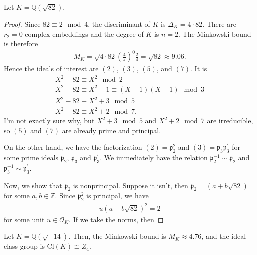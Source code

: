 \begin{exmbox}
    \begin{example}
        Let \(K = \mathbb{Q}(\sqrt{82})\).
    \end{example}    
\end{exmbox}
\begin{proof}
    Since \(82 \equiv 2 \mod{4}\), the discriminant of \(K\) is \(\Delta_K = 4 \cdot 82\). There are \(r_2 = 0\) complex embeddings and the degree of \(K\) is \(n = 2\). The Minkowski bound is therefore
    \begin{align*}
        M_K = \sqrt{4 \cdot 82} \left(\frac{4}{\pi}\right)^0 \frac{2}{4} = \sqrt{82} \approx 9.06 \text{.}
    \end{align*}
    Hence the ideals of interest are \((2)\), \((3)\), \((5)\), and \((7)\). It is
    \begin{align*}
        X^2 - 82 \equiv X^2 \mod{2} \\
        X^2 - 82 \equiv X^2 - 1 \equiv (X + 1)(X - 1) \mod{3} \\
        X^2 - 82 \equiv X^2 + 3 \mod{5} \\
        X^2 - 82 \equiv X^2 + 2 \mod{7} \text{.}
    \end{align*}
    I'm not exactly sure why, but \(X^2 + 3 \mod{5}\) and \(X^2 + 2 \mod{7}\) are irreducible, so \((5)\) and \((7)\) are already prime and principal.

    On the other hand, we have the factorization \((2) = \mathfrak{p}_2^2\) and \((3) = \mathfrak{p}_3 \mathfrak{p}_3^\prime\) for some prime ideals \(\mathfrak{p}_2\), \(\mathfrak{p}_3\) and \(\mathfrak{p}_3^\prime\). We immediately have the relation \(\mathfrak{p}_2^{-1} \sim \mathfrak{p}_2\) and \(\mathfrak{p}_3^{-1} \sim \mathfrak{p}_3^\prime\).

    Now, we show that \(\mathfrak{p}_2\) is nonprincipal. Suppose it isn't, then \(\mathfrak{p}_2 = (a + b \sqrt{82})\) for some \(a, b \in \mathbb{Z}\). Since \(\mathfrak{p}_2^2\) is principal, we have
    \begin{align*}
        u \left(a + b\sqrt{82}\right)^2 = 2
    \end{align*}
    for some unit \(u \in \mathcal{O}_K\). If we take the norms, then 
\end{proof}



\begin{exmbox}
    \begin{example}
        Let \(K = \mathbb{Q}(\sqrt{-14})\). Then, the Minkowski bound is \(M_K \approx 4.76\), and the ideal class group is \(\mathrm{Cl}(K) \cong Z_4\).
    \end{example}    
\end{exmbox}

